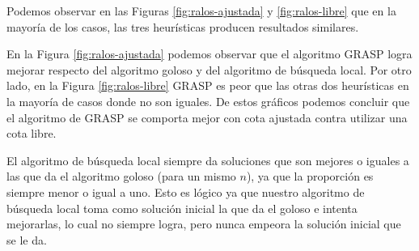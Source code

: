 Podemos observar en las Figuras \ref{fig:ralos-ajustada} y \ref{fig:ralos-libre} que en la mayoría de los casos, las tres heurísticas producen resultados similares.

En la Figura \ref{fig:ralos-ajustada} podemos observar que el algoritmo GRASP logra mejorar respecto del algoritmo goloso y del algoritmo de búsqueda local. Por otro lado, en la Figura \ref{fig:ralos-libre} GRASP es peor que las otras dos heurísticas en la mayoría de casos donde no son iguales. De estos gráficos podemos concluir que el algoritmo de GRASP se comporta mejor con cota ajustada contra utilizar una cota libre.

El algoritmo de búsqueda local siempre da soluciones que son mejores o iguales a las que da el algoritmo goloso (para un mismo $n$), ya que la proporción es siempre menor o igual a uno. Esto es lógico ya que nuestro algoritmo de búsqueda local toma como solución inicial la que da el goloso e intenta mejorarlas, lo cual no siempre logra, pero nunca empeora la solución inicial que se le da.


